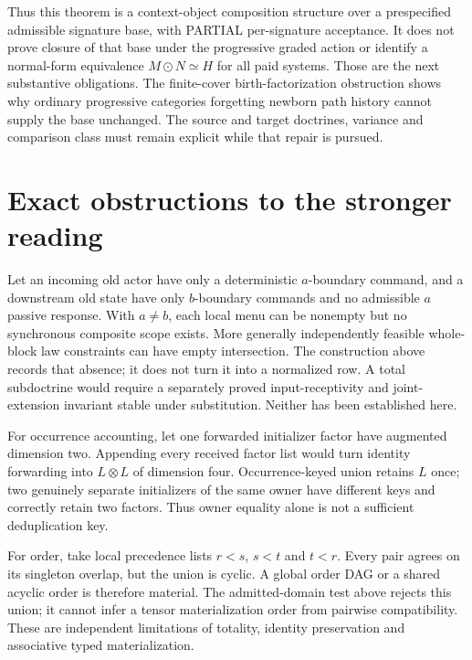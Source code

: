 \documentclass[11pt]{article}\usepackage{amsmath,amssymb,amsthm,geometry}\geometry{margin=1in}
\begin{document}
Thus this theorem is a context-object composition structure over a prespecified admissible signature base, with PARTIAL per-signature acceptance. It does not prove closure of that base under the progressive graded action or identify a normal-form equivalence $M\odot N\simeq H$ for all paid systems. Those are the next substantive obligations. The finite-cover birth-factorization obstruction shows why ordinary progressive categories forgetting newborn path history cannot supply the base unchanged. The source and target doctrines, variance and comparison class must remain explicit while that repair is pursued.

\section{Exact obstructions to the stronger reading}
Let an incoming old actor have only a deterministic $a$-boundary command, and a downstream old state have only $b$-boundary commands and no admissible $a$ passive response. With $a\ne b$, each local menu can be nonempty but no synchronous composite scope exists. More generally independently feasible whole-block law constraints can have empty intersection. The construction above records that absence; it does not turn it into a normalized row. A total subdoctrine would require a separately proved input-receptivity and joint-extension invariant stable under substitution. Neither has been established here.

For occurrence accounting, let one forwarded initializer factor have augmented dimension two. Appending every received factor list would turn identity forwarding into $L\otimes L$ of dimension four. Occurrence-keyed union retains $L$ once; two genuinely separate initializers of the same owner have different keys and correctly retain two factors. Thus owner equality alone is not a sufficient deduplication key.

For order, take local precedence lists $r<s$, $s<t$ and $t<r$. Every pair agrees on its singleton overlap, but the union is cyclic. A global order DAG or a shared acyclic order is therefore material. The admitted-domain test above rejects this union; it cannot infer a tensor materialization order from pairwise compatibility. These are independent limitations of totality, identity preservation and associative typed materialization.
\end{document}

